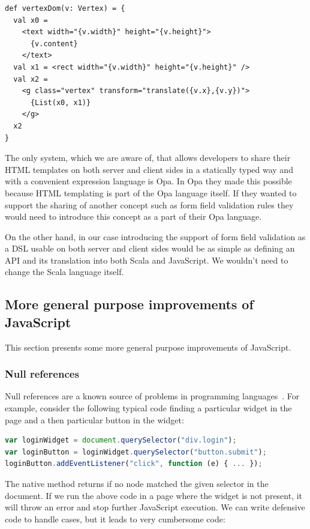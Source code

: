 \documentclass[american,english,runningheads]{llncs}
\begin{document}
\begin{lstlisting}
def vertexDom(v: Vertex) = {
  val x0 =
    <text width="{v.width}" height="{v.height}">
      {v.content}
    </text>
  val x1 = <rect width="{v.width}" height="{v.height}" />
  val x2 =
    <g class="vertex" transform="translate({v.x},{v.y})">
      {List(x0, x1)}
    </g>
  x2
}
\end{lstlisting}

The only system, which we are aware of, that allows developers to share their HTML templates on both server and client sides in a statically typed way and with a convenient expression language is Opa. In Opa they made this possible because HTML templating is part of the Opa language itself. If they wanted to support the sharing of another concept such as form field validation rules they would need to introduce this concept as a part of their Opa language.

On the other hand, in our case introducing the support of form field validation as a DSL usable on both server and client sides would be as simple as defining an API and its translation into both Scala and JavaScript. We wouldn’t need to change the Scala language itself.

\subsection{More general purpose improvements of JavaScript}

This section presents some more general purpose improvements of JavaScript.

\subsubsection{Null references}

Null references are a known source of problems in programming languages~\cite{Hoare09_Null,Nanda09_Null}. For example, consider the following typical code finding a particular widget in the page and a then particular button in the widget:

\begin{lstlisting}[language=JavaScript,label=null-unsafe,caption=Unsafe code]
var loginWidget = document.querySelector("div.login");
var loginButton = loginWidget.querySelector("button.submit");
loginButton.addEventListener("click", function (e) { ... });
\end{lstlisting}

The native  method returns  if no node matched the given selector in the document. If we run the above code in a page where the widget is not present, it will throw an error and stop further JavaScript execution. We can write defensive code to handle  cases, but it leads to very cumbersome code:
\end{document}
